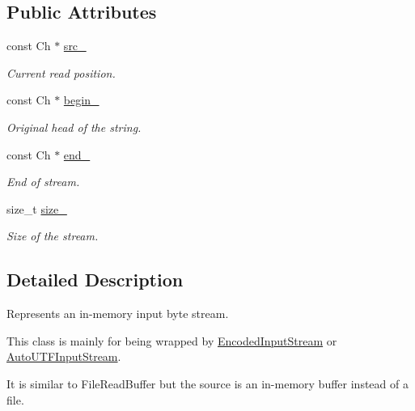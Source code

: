 \subsection*{Public Attributes}
\begin{DoxyCompactItemize}
\item 
\mbox{\label{a02296_a57cf6cb5766e931a62928b9f92507443}} 
const Ch $\ast$ \hyperlink{a02296_a57cf6cb5766e931a62928b9f92507443}{src\+\_\+}
\begin{DoxyCompactList}\small\item\em Current read position. \end{DoxyCompactList}\item 
\mbox{\label{a02296_a91f0767b4f0ed2476d835e8344848a2f}} 
const Ch $\ast$ \hyperlink{a02296_a91f0767b4f0ed2476d835e8344848a2f}{begin\+\_\+}
\begin{DoxyCompactList}\small\item\em Original head of the string. \end{DoxyCompactList}\item 
\mbox{\label{a02296_a55fb302ba0492419757e3ba318c8c654}} 
const Ch $\ast$ \hyperlink{a02296_a55fb302ba0492419757e3ba318c8c654}{end\+\_\+}
\begin{DoxyCompactList}\small\item\em End of stream. \end{DoxyCompactList}\item 
\mbox{\label{a02296_ab26a1b5c6d5e8f52c0f6982feba47f36}} 
size\+\_\+t \hyperlink{a02296_ab26a1b5c6d5e8f52c0f6982feba47f36}{size\+\_\+}
\begin{DoxyCompactList}\small\item\em Size of the stream. \end{DoxyCompactList}\end{DoxyCompactItemize}


\subsection{Detailed Description}
Represents an in-\/memory input byte stream. 

This class is mainly for being wrapped by \hyperlink{a02124}{Encoded\+Input\+Stream} or \hyperlink{a02136}{Auto\+U\+T\+F\+Input\+Stream}.

It is similar to File\+Read\+Buffer but the source is an in-\/memory buffer instead of a file.

